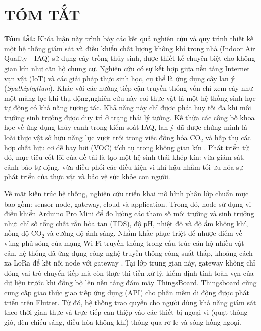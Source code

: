 \chapter*{TÓM TẮT}
\fontsize{13}{15}\selectfont

\textbf{Tóm tắt:} Khóa luận này trình bày các kết quả nghiên cứu và quy trình thiết kế một hệ thống giám sát và điều khiển chất lượng không khí trong nhà (Indoor Air Quality - IAQ) sử dụng cây trồng thủy sinh, được thiết kế chuyên biệt cho không gian kín như căn hộ chung cư. Nghiên cứu có sự kết hợp  giữa nền tảng Internet vạn vật (IoT) và các giải pháp thực sinh học, cụ thể là ứng dụng cây lan ý (\textit{Spathiphyllum}). Khác với các hướng tiếp cận truyền thống vốn chỉ xem cây như một màng lọc khí thụ động,nghiên cứu này coi thực vật là một hệ thống sinh học tự động có khả năng tương tác. Khả năng này chỉ được phát huy tối đa khi môi trường sinh trưởng được duy trì ở trạng thái lý tưởng. Kế thừa các công bố khoa học về ứng dụng thủy canh trong kiểm soát IAQ, lan ý đã được chứng minh là loài thực vật sở hữu năng lực vượt trội trong việc đồng hóa CO$_2$ và hấp thụ các hợp chất hữu cơ dễ bay hơi (VOC) tích tụ trong không gian kín \cite{hydroponic_iaq_survey,nasa_clean_air}. Phát triển từ đó, mục tiêu cốt lõi của đề tài là  tạo một hệ sinh thái khép kín: vừa giám sát, cảnh báo tự động, vừa điều phối các điều kiện vi khí hậu nhằm tối ưu hóa sự phát triển của thực vật và bảo vệ sức khỏe con người.

Về mặt kiến trúc hệ thống, nghiên cứu triển khai mô hình phân lớp chuẩn mực bao gồm: sensor node, gateway, cloud và application. Trong đó, node sử dụng vi điều khiển Arduino Pro Mini để đo lường  các tham số môi trường và sinh trưởng như: chỉ số tổng chất rắn hòa tan (TDS), độ pH, nhiệt độ và độ ẩm không khí, nồng độ CO$_2$ và cường độ ánh sáng. Nhằm khắc phục triệt để nhược điểm về vùng phủ sóng của mạng Wi-Fi truyền thống trong cấu trúc căn hộ nhiều vật cản, hệ thống đã  ứng dụng công nghệ truyền thông công suất thấp, khoảng cách xa LoRa để kết nối node với gateway . Tại lớp trung gian này, gateway không chỉ đóng vai trò chuyển tiếp mà còn thực thi tiền xử lý, kiểm định tính toàn vẹn của dữ liệu trước khi đồng bộ lên nền tảng đám mây ThingsBoard. Thingsboard cũng cung cấp giao thức giao tiếp ứng dụng (API) cho phần mềm di động được phát triển trên Flutter. Từ đó, hệ thống trao quyền cho người dùng khả năng giám sát theo thời gian thực và trực tiếp can thiệp vào các thiết bị ngoại vi (quạt thông gió, đèn chiếu sáng, điều hòa không khí) thông qua  rơ-le và sóng hồng ngoại.

